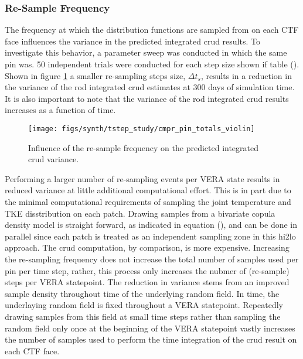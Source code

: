 \subsubsection{Re-Sample Frequency}

The frequency at which the distribution functions are sampled from on each CTF face influences the variance in the predicted integrated crud results.  To investigate this behavior, a parameter sweep was conducted in which the same pin was.  50 independent trials were conducted for each step size shown if table ().  Shown in figure \ref{fig:cmprpintotalsviolin} a smaller re-sampling steps size, $\Delta t_s$, results in a reduction in the variance of the rod integrated crud estimates at 300 days of simulation time.  It is also important to note that the variance of the rod integrated crud results increases as a function of time.

\begin{figure}[H]
    \centering
    \texttt{[image: figs/synth/tstep\_study/cmpr\_pin\_totals\_violin]}
    \caption{Influence of the re-sample frequency on the predicted integrated crud variance.}
    \label{fig:cmprpintotalsviolin}
\end{figure}

Performing a larger number of re-sampling events per VERA state results in reduced variance at little additional computational effort.
This is in part due to the minimal computational requirements of sampling the joint temperature and TKE disstribution on each patch.  Drawing samples from a bivariate copula density model is straight forward, as indicated in equation (), and can be done in parallel since each patch is treated as an independent sampling zone in this hi2lo approach.  The crud computation, by comparison, is more expensive.  Increasing the re-sampling frequency does not increase the total number of samples used per pin per time step, rather, this process only increases the nubmer of (re-sample) steps per VERA statepoint.  The reduction in variance stems from an improved sample density throughout time of the underlying random field.  In time, the underlaying random field is fixed throughout a VERA statepoint.  Repeatedly drawing samples from this field at small time steps rather than sampling the random field only once at the beginning of the VERA statepoint vastly increases the number of samples used to perform the time integration of the crud result on each CTF face.


